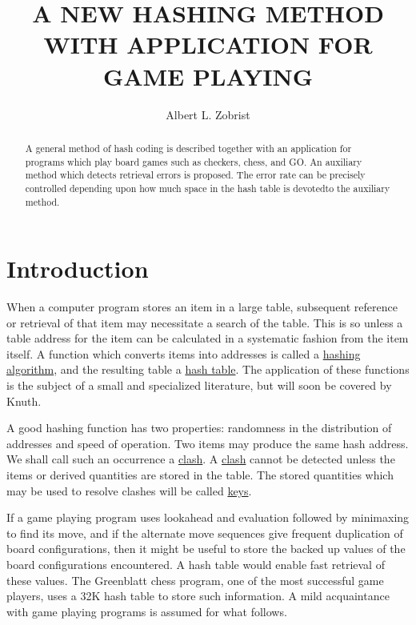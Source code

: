 \documentclass{article}
\begin{document}
\title{A NEW HASHING METHOD WITH APPLICATION FOR GAME PLAYING}
\author{Albert L. Zobrist}
\maketitle

\begin{abstract}
A general method of hash coding is described together with an application for
programs which play board games such as checkers, chess, and GO. An auxiliary
method which detects retrieval errors is proposed. The error rate can be
precisely controlled depending upon how much space in the hash table is
devotedto the auxiliary method.
\end{abstract}

\section*{Introduction}

When a computer program stores an item in a large table, subsequent reference
or retrieval of that item may necessitate a search of the table. This is so
unless a table address for the item can be calculated in a systematic fashion
from the item itself. A function which converts items into addresses is called
a \underline{hashing algorithm}, and the resulting table a \underline{hash
table}. The application of these functions is the subject of a small and
specialized literature, but will soon be covered by Knuth\cite{knuth}.

A good hashing function has two properties: randomness in the distribution of
addresses and speed of operation. Two items may produce the same hash address.
We shall call such an occurrence a \underline{clash}. A \underline{clash}
cannot be detected unless the items or derived quantities are stored in the
table. The stored quantities which may be used to resolve clashes will be called
\underline{keys}.

If a game playing program uses lookahead and evaluation followed by minimaxing
to find its move, and if the alternate move sequences give frequent duplication
of board configurations, then it might be useful to store the backed up values
of the board configurations encountered. A hash table would enable fast
retrieval of these values. The Greenblatt chess program\cite{greenblatt}, one
of the most successful game players, uses a 32K hash table to store such
information. A mild acquaintance with game playing programs is assumed for what
follows.
\end{document}
